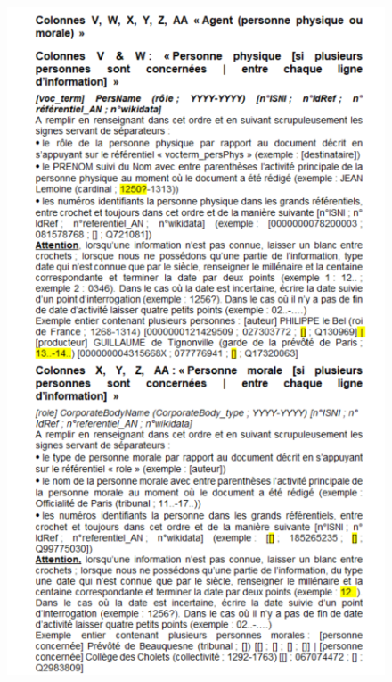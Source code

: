 \begin{figure}[!h]
    \centering
    \includegraphics[width=0.85\linewidth]{annexes/methodologie3.png}
\end{figure}
